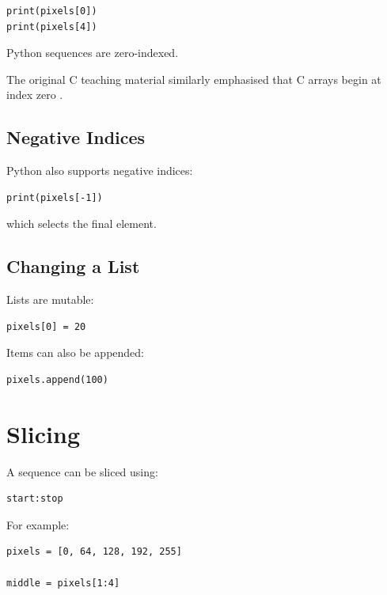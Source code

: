 \begin{verbatim}
print(pixels[0])
print(pixels[4])
\end{verbatim}

Python sequences are zero-indexed.

The original C teaching material similarly emphasised that C arrays
begin at index zero
\cite{johnson_uqc146_c2}.


\subsection{Negative Indices}

Python also supports negative indices:

\begin{verbatim}
print(pixels[-1])
\end{verbatim}

which selects the final element.


\subsection{Changing a List}

Lists are mutable:

\begin{verbatim}
pixels[0] = 20
\end{verbatim}

Items can also be appended:

\begin{verbatim}
pixels.append(100)
\end{verbatim}


\section{Slicing}
\label{sec:python-slicing}

A sequence can be sliced using:

\begin{verbatim}
start:stop
\end{verbatim}

For example:

\begin{verbatim}
pixels = [0, 64, 128, 192, 255]

middle = pixels[1:4]
\end{verbatim}

